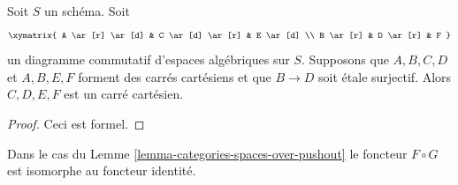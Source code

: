 \begin{lemma}
\label{lemma-diagram}
Soit $S$ un schéma. Soit
$$
\xymatrix{
A \ar[r] \ar[d] & C \ar[d] \ar[r] & E \ar[d] \\
B \ar[r] & D \ar[r] & F
}
$$
un diagramme commutatif d'espaces algébriques sur $S$.
Supposons que $A, B, C, D$ et $A, B, E, F$ forment des carrés cartésiens
et que $B \to D$ soit \'etale surjectif.
Alors $C, D, E, F$ est un carré cartésien.
\end{lemma}

\begin{proof}
Ceci est formel.
\end{proof}

\begin{lemma}
\label{lemma-equivalence-categories-spaces-over-pushout}
Dans le cas du Lemme \ref{lemma-categories-spaces-over-pushout}
le foncteur $F \circ G$ est isomorphe au foncteur identité.
\end{lemma}

